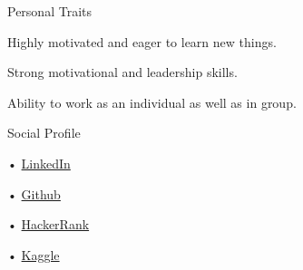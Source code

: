 \documentclass{resume} %
\begin{document}
\begin{rSection}{Personal Traits}
\item Highly motivated and eager to learn new things.
\item Strong motivational and leadership skills.
\item Ability to work as an individual as well as in group.
\end{rSection}

\begin{rSection}{Social Profile}
\item[•] \href{https://www.linkedin.com/in/md-abdul-hasib-sazzad-19b88099/}{LinkedIn}
\item[•] \href{https://github.com/sazzadBuet08/}{Github}
\item[•] \href{https://www.hackerrank.com/SazzadBuet08}{HackerRank}
\item[•] \href{https://www.kaggle.com/sazzadabdulhasib}{Kaggle}
\end{rSection}
\end{document}
